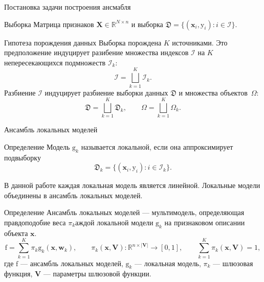 \documentclass[9pt,pdf,hyperref={unicode}]{beamer}
\begin{document}
\begin{frame}{Постановка задачи построения ансмабля}
\begin{block}{Выборка}
Матрица признаков $\mathbf{X} \in \mathbb{R}^{N\times n}$ и выборка $\mathfrak{D} = \{(\mathbf{x}_i, \mathrm{y}_i): i \in \mathcal{I}\}$.
\end{block}
\begin{block}{Гипотеза порождения данных}
Выборка порождена $K$ источниками. Это предположение индуцирует разибение множества индексов $\mathcal{I}$ на $K$ непересекающихся подмножеств $\mathcal{I}_k$:
    \[\mathcal{I} = \bigsqcup_{k=1}^K \mathcal{I}_k.\]
Разбиение $\mathcal{I}$ индуцирует разбиение выборки данных $\mathfrak{D}$ и множества объектов~$\Omega$:
    \[\mathfrak{D} = \bigsqcup_{k=1}^K \mathfrak{D}_k, \qquad \Omega = \bigsqcup_{k=1}^K \Omega_k. \]
\end{block}
    
\end{frame}


\begin{frame}{Ансамбль локальных моделей}
    \begin{block}{Определение}
            Модель $ \mathrm{g}_k$ называется локальной, если она аппроксимирует подвыборку 
            \[\mathfrak{D}_k = \{(\mathbf{x}_i, \mathrm{y}_i): i \in \mathcal{I}_k\}.\]
    
    \end{block}

В данной работе каждая локальная модель является линейной. Локальные модели объединены в ансамбль локальных моделей. 
    \begin{block}{Определение}
        Ансамбль локальных моделей — мультимодель, определяющая правдоподобие веса $\pi_k$аждой локальной модели $\mathrm{g}_k$ на признаковом описании объекта $\mathbf{x}$.
\[\mathrm{f} = \sum\limits_{k=1}^K \pi_k \mathrm{g}_k(\mathbf{x}, \mathbf{w}_k), \qquad \pi_k(\mathbf{x}, \mathbf{V}): \mathbb{R}^{n\times |\mathbf{V}|}\rightarrow [0,1], \qquad \sum_{k=1}^K \pi_k(\mathbf{x}, \mathbf{V}) = 1, \]
где $\mathrm{f}$ --- ансамбль локальных моделей, $\mathrm{g}_k$ --- локальная модель,  $\pi_k$ --- шлюзовая функция, $\mathbf{V}$ --- параметры шлюзовой функции.

    \end{block}
\end{frame}
\end{document}
